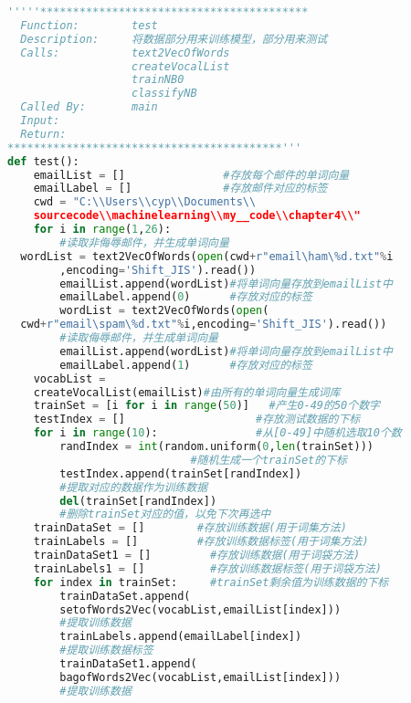 \begin{lstlisting}[language=python]
'''''*****************************************
  Function:        test 
  Description:     将数据部分用来训练模型，部分用来测试 
  Calls:           text2VecOfWords 
                   createVocalList 
                   trainNB0 
                   classifyNB 
  Called By:       main 
  Input: 
  Return:           
******************************************'''  
def test():  
    emailList = []               #存放每个邮件的单词向量  
    emailLabel = []              #存放邮件对应的标签  
    cwd = "C:\\Users\\cyp\\Documents\\
    sourcecode\\machinelearning\\my__code\\chapter4\\"  
    for i in range(1,26):  
        #读取非侮辱邮件，并生成单词向量  
  wordList = text2VecOfWords(open(cwd+r"email\ham\%d.txt"%i
        ,encoding='Shift_JIS').read())  
        emailList.append(wordList)#将单词向量存放到emailList中  
        emailLabel.append(0)      #存放对应的标签  
        wordList = text2VecOfWords(open(
  cwd+r"email\spam\%d.txt"%i,encoding='Shift_JIS').read())  
        #读取侮辱邮件，并生成单词向量  
        emailList.append(wordList)#将单词向量存放到emailList中  
        emailLabel.append(1)      #存放对应的标签  
    vocabList = 
    createVocalList(emailList)#由所有的单词向量生成词库  
    trainSet = [i for i in range(50)]   #产生0-49的50个数字  
    testIndex = []                    #存放测试数据的下标  
    for i in range(10):               #从[0-49]中随机选取10个数  
        randIndex = int(random.uniform(0,len(trainSet)))  
                            #随机生成一个trainSet的下标  
        testIndex.append(trainSet[randIndex])
        #提取对应的数据作为训练数据  
        del(trainSet[randIndex])  
        #删除trainSet对应的值，以免下次再选中  
    trainDataSet = []        #存放训练数据(用于词集方法)  
    trainLabels = []         #存放训练数据标签(用于词集方法)  
    trainDataSet1 = []         #存放训练数据(用于词袋方法)  
    trainLabels1 = []          #存放训练数据标签(用于词袋方法)  
    for index in trainSet:     #trainSet剩余值为训练数据的下标  
        trainDataSet.append(
        setofWords2Vec(vocabList,emailList[index]))  
        #提取训练数据  
        trainLabels.append(emailLabel[index])  
        #提取训练数据标签  
        trainDataSet1.append(
        bagofWords2Vec(vocabList,emailList[index]))  
        #提取训练数据  

\end{lstlisting}
